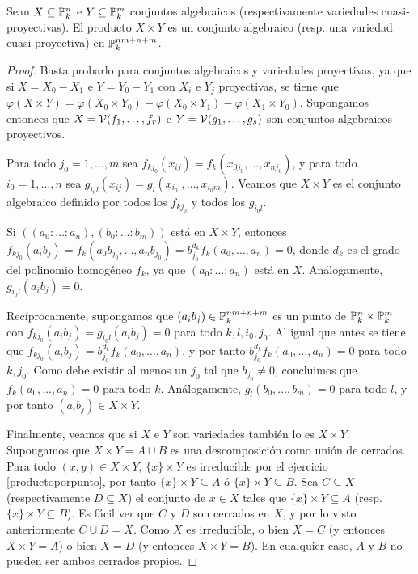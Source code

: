 \documentclass[ACGA.tex]{subfiles}
\begin{document}
\begin{prop}\label{productoirreducible}
 Sean $X\subseteq\mathbb{P}^n_k$ e $Y\subseteq\mathbb{P}^m_k$ conjuntos algebraicos (respectivamente variedades cuasi-proyectivas). El producto $X\times Y$ es un conjunto algebraico (resp. una variedad cuasi-proyectiva) en $\mathbb{P}^{nm+n+m}_k$.
\end{prop}

\begin{proof}
 Basta probarlo para conjuntos algebraicos y variedades proyectivas, ya que si $X=X_0-X_1$ e $Y=Y_0-Y_1$ con $X_i$ e $Y_j$ proyectivas, se tiene que $\varphi(X\times Y)=\varphi(X_0\times Y_0)-\varphi(X_0\times Y_1)-\varphi(X_1\times Y_0)$. Supongamos entonces que $X=\mathcal{V}(f_1,\ldots,f_r)$ e $Y=\mathcal{V}(g_1,\ldots,g_s)$ son conjuntos algebraicos proyectivos.

Para todo $j_0=1,\ldots,m$ sea $f_{kj_0}(x_{ij})=f_k(x_{0j_0},\ldots,x_{nj_0})$, y para todo $i_0=1,\ldots,n$ sea $g_{i_0l}(x_{ij})=g_l(x_{i_01},\ldots,x_{i_0m})$. Veamos que $X\times Y$ es el conjunto algebraico definido por todos los $f_{kj_0}$ y todos los $g_{i_0l}$. 

Si $((a_0:\ldots:a_n),(b_0:\ldots:b_m))$ está en $X\times Y$, entonces $f_{kj_0}(a_ib_j)=f_k(a_0b_{j_0},\ldots,a_nb_{j_0})=b_{j_0}^{d_k}f_k(a_0,\ldots,a_n)=0$, donde $d_k$ es el grado del polinomio homogéneo $f_k$, ya que $(a_0:\ldots:a_n)$ está en $X$. Análogamente, $g_{i_0l}(a_ib_j)=0$.

Recíprocamente, supongamos que $(a_ib_j)\in\mathbb{P}^{nm+n+m}_k$ es un punto de $\mathbb{P}^n_k\times\mathbb{P}^m_k$ con $f_{kj_0}(a_ib_j)=g_{i_0l}(a_ib_j)=0$ para todo $k,l,i_0,j_0$. Al igual que antes se tiene que $f_{kj_0}(a_ib_j)=b_{j_0}^{d_k}f_k(a_0,\ldots,a_n)$, y por tanto $b_{j_0}^{d_k}f_k(a_0,\ldots,a_n)=0$ para todo $k,j_0$. Como debe existir al menos un $j_0$ tal que $b_{j_0}\neq 0$, concluimos que $f_k(a_0,\ldots,a_n)=0$ para todo $k$. Análogamente, $g_l(b_0,\ldots,b_m)=0$ para todo $l$, y por tanto $(a_ib_j)\in X\times Y$.

Finalmente, veamos que si $X$ e $Y$ son variedades también lo es $X\times Y$. Supongamos que $X\times Y=A\cup B$ es una descomposición como unión de cerrados. Para todo $(x,y)\in X\times Y$, $\{x\}\times Y$ es irreducible por el ejercicio \ref{productoporpunto}, por tanto $\{x\}\times Y\subseteq A$ ó $\{x\}\times Y\subseteq B$. Sea $C\subseteq X$ (respectivamente $D\subseteq X$) el conjunto de $x\in X$ tales que $\{x\}\times Y\subseteq A$ (resp. $\{x\}\times Y\subseteq B$). Es fácil ver que $C$ y $D$ son cerrados en $X$, y por lo visto anteriormente $C\cup D=X$. Como $X$ es irreducible, o bien $X=C$ (y entonces $X\times Y=A$) o bien $X=D$ (y entonces $X\times Y=B$). En cualquier caso, $A$ y $B$ no pueden ser ambos cerrados propios.
\end{proof}
\end{document}
